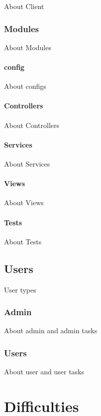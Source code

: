 \documentclass[a4paper,11pt]{report}
\begin{document}
About Client

\subsection{Modules}

About Modules

\subsubsection{config}

About configs

\subsubsection{Controllers}

About Controllers

\subsubsection{Services}

About Services

\subsubsection{Views}

About Views

\subsubsection{Tests}

About Tests

\section{Users}

User types

\subsection{Admin}

About admin and admin tasks

\subsection{Users}

About user and user tasks

\chapter{Difficulties}
\end{document}
